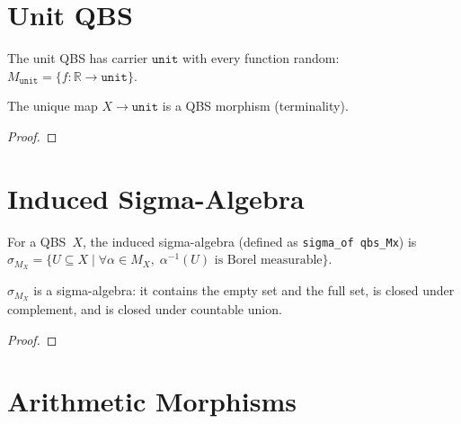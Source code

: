 \section{Unit QBS}\label{sec:unit}

\begin{definition}\label{def:unitQ}
  \rocqok
  The unit QBS has carrier $\mathtt{unit}$ with every function random:
  $M_{\mathtt{unit}} = \{f : \mathbb{R} \to \mathtt{unit}\}$.
\end{definition}

\begin{lemma}\label{lem:qbs_morphism_unit}
  \rocqok
  The unique map $X \to \mathtt{unit}$ is a QBS morphism (terminality).
\end{lemma}
\begin{proof}\rocqok\end{proof}


\section{Induced Sigma-Algebra}\label{sec:sigma_Mx}

\begin{definition}\label{def:sigma_Mx}
  \rocqok
  For a QBS~$X$, the induced sigma-algebra (defined as \texttt{sigma\_of qbs\_Mx}) is
  $\sigma_{M_X} = \{U \subseteq X \mid \forall \alpha \in M_X,\;
  \alpha^{-1}(U) \text{ is Borel measurable}\}$.
\end{definition}

\begin{lemma}\label{lem:sigma_Mx_axioms}
  \rocqok
  $\sigma_{M_X}$ is a sigma-algebra: it contains the empty set and the full set, is closed
  under complement, and is closed under countable union.
\end{lemma}
\begin{proof}\rocqok\end{proof}


\section{Arithmetic Morphisms}\label{sec:arithmetic}

